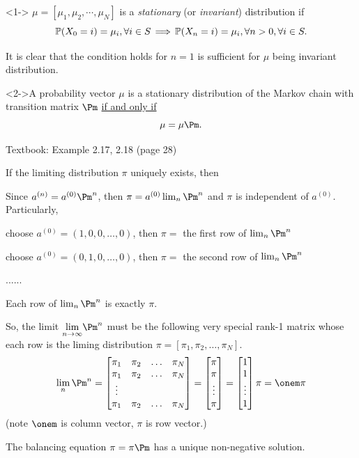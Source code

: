 \documentclass[english,10pt]{beamer}
\begin{document}
\begin{frame}
\begin{definition}%
<1-> $\mu=[\mu_{1},\mu_{2},\cdots,\mu_{N}]$ is a
\textit{stationary} (or \textit{invariant}) distribution if 
\[
\mathbb{P}(X_{0}=i)=\mu_{i}, \forall i \in S \, \Longrightarrow\,\mathbb{P}(X_{n}=i)=\mu_{i}, \forall n >0, \forall i\in S.
\]
\end{definition}%

It is clear that  the condition holds for $n=1$ is sufficient for $\mu$ being invariant distribution.

\medskip 
\begin{theorem}%
<2->A probability vector $\mu$ is a  {stationary}
distribution of the Markov chain with transition  matrix $\Pm$ \underline{if and only if}
\[
\mu=\mu \Pm.
\]

\end{theorem}%
 \bigskip
Textbook: 
Example 2.17, 2.18  (page 28)

\end{frame}


\begin{frame}{If the   limiting distribution $\pi$ uniquely exists, then }

\biz[<+->]
\item Since $a^{(n)}=a^{(0)}\Pm^n$, then  $\pi = a^{(0)}\lim_n\Pm^n$ and $\pi$ is independent of $a^{(0)}$. Particularly,
\biz
\item  choose $a^{(0)}=(1,0,0,\ldots, 0)$, then $\pi=$ the first row of  $\lim_n\Pm^n$
\item   choose $a^{(0)}=(0,1,0,\ldots, 0)$, then $\pi=$ the second row of  $\lim_n\Pm^n$
\item ......
\item Each row of    $\lim_n\Pm^n$ is exactly $\pi$.
\eiz
\item So, the limit $ \underset{n\to\infty}\lim\Pm^n$ must be the following very special rank-1 matrix whose each row
is the liming distribution $\pi=[\pi_1,\pi_2,\ldots,\pi_N]$.
\[
\lim_n\Pm^n =
\begin{bmatrix}
   \pi_1 & \pi_2 &  \ldots &\pi_N \\
    \pi_1 & \pi_2 &  \ldots & \pi_N \\
    \vdots\\
      \pi_1 & \pi_2 &  \ldots & \pi_N
    \\
 \end{bmatrix} =
\begin{bmatrix}
   \pi \\
   \pi \\
   \vdots
   \\
   \pi
\end{bmatrix} =\begin{bmatrix}
   1 \\
   1\\
   \vdots
   \\
   1
\end{bmatrix} \pi
=\onem \pi
\]
(note $\onem$ is column vector, $\pi$ is row vector.)
\item The balancing equation  $\pi = \pi \Pm$ has a unique non-negative solution.
\eiz



\end{frame}
\end{document}
